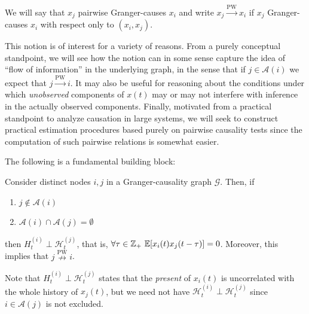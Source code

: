 \documentclass[12pt]{article}
\def\pwgc{\overset{\text{PW}}{\rightarrow}}  %
\def\npwgc{\overset{\text{PW}}{\nrightarrow}}  %
\def\gcg{\mathcal{G}}  %
\def\H{\mathcal{H}}  %
\newcommand{\anc}[1]{\mathcal{A}(#1)}  %
\begin{document}
\begin{definition}
  We will say that $x_j$ pairwise Granger-causes $x_i$ and write
  $x_j \pwgc x_i$ if $x_j$ Granger-causes $x_i$ with respect only to
  $(x_i, x_j)$.
\end{definition}

This notion is of interest for a variety of reasons.  From a purely
conceptual standpoint, we will see how the notion can in some sense
capture the idea of ``flow of information'' in the underlying graph,
in the sense that if $j \in \anc{i}$ we expect that $j \pwgc i$.  It
may also be useful for reasoning about the conditions under which
\textit{unobserved} components of $x(t)$ may or may not interfere with
inference in the actually observed components.  Finally, motivated
from a practical standpoint to analyze causation in large systems, we
will seek to construct practical estimation procedures based purely on
pairwise causality tests since the computation of such pairwise
relations is somewhat easier.

The following is a fundamental building block:

\begin{lemma}
  \label{lem:ancestor_uncorrelated}
  Consider distinct nodes $i, j$ in a Granger-causality graph
  $\gcg$.  Then, if

  \begin{enumerate}[label=(\alph*)]
    \item{$j \not\in \anc{i}$}
    \item{$\anc{i}\cap\anc{j} = \emptyset$}
  \end{enumerate}

  then $H_t^{(i)} \perp \H_t^{(j)}$, that is,
  $\forall \tau \in \Z_+\ \E[x_i(t)x_j(t - \tau)] = 0$.  Moreover,
  this implies that $j \npwgc i$.
\end{lemma}

\begin{remark}
  Note that $H_t^{(i)} \perp \H_t^{(j)}$ states that the \textit{present}
  of $x_i(t)$ is uncorrelated with the whole history of $x_j(t)$, but
  we need not have $\H_t^{(i)} \perp \H_t^{(j)}$ since $i \in \anc{j}$ is
  not excluded.
\end{remark}
\end{document}
